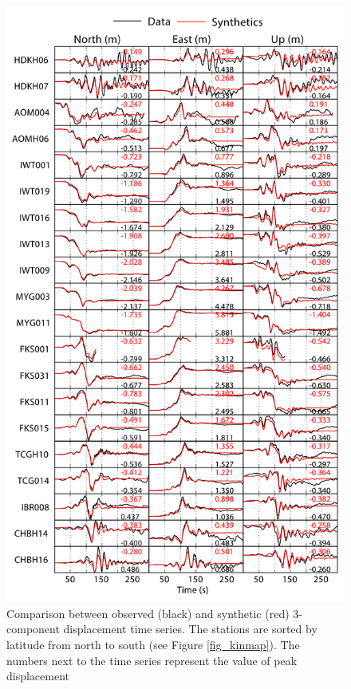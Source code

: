 \begin{figure}[!ht] 
  \centering
  \includegraphics[width=0.72\linewidth]{./figures/ch4/disp_data_vs_synthetics}
    \caption[Data fits No. 1 for the kinematic inversion]{Comparison between observed (black) and synthetic (red) 3-component displacement time series. The stations are sorted by latitude from north to south (see Figure \ref{fig_kinmap}). The numbers next to the time series represent the value of peak displacement}
  \label{fig_dispfits}
\end{figure}

